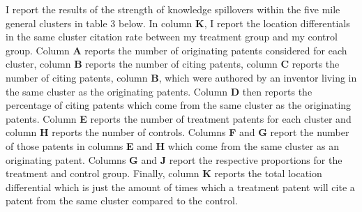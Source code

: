 \documentclass[12pt,letterpaper]{article}
\begin{document}
I report the results of the strength of knowledge spillovers within the five mile general clusters in table 3 below. In column \textbf{K}, I report the location differentials in the same cluster citation rate between my treatment group and my control group. Column \textbf{A} reports the number of originating patents considered for each cluster, column \textbf{B} reports the number of citing patents, column \textbf{C} reports the number of citing patents, column \textbf{B}, which were authored by an inventor living in the same cluster as the originating patents. Column \textbf{D} then reports the percentage of citing patents which come from the same cluster as the originating patents. Column \textbf{E} reports the number of treatment patents for each cluster and column \textbf{H} reports the number of controls. Columns \textbf{F} and \textbf{G} report the number of those patents in columns \textbf{E} and \textbf{H} which come from the same cluster as an originating patent. Columns \textbf{G} and \textbf{J} report the respective proportions for the treatment and control group. Finally, column \textbf{K} reports the total location differential which is just the amount of times which a treatment patent will cite a patent from the same cluster compared to the control.
\end{document}
